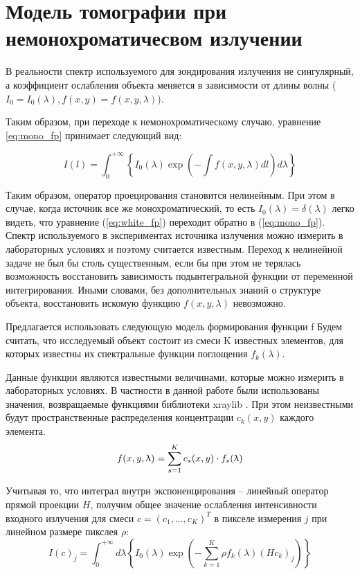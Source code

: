 \section{Модель томографии при немонохроматичесвом излучении}

В реальности спектр используемого для зондирования излучения не сингулярный, а коэффициент ослабления объекта меняется в зависимости от длины волны ($I_0 = I_0(\lambda), f(x, y) = f(x, y, \lambda)$).

Таким образом, при переходе к немонохроматическому случаю, уравнение \ref{eq:mono_fp} принимает следующий вид:

\begin{equation}
\label{eq:white_fp}
I(l) = \int_0^{+\infty}{\left\{
  I_0(\lambda) \exp{\left(-\int{f(x, y, \lambda) dl} \right) d\lambda} 
  \right\}}  
\end{equation}

Таким образом, оператор проецирования становится нелинейным.
При этом в случае, когда источник все же монохроматический, то есть $I_0(\lambda) = \delta(\lambda)$ легко видеть, что уравнение (\ref{eq:white_fp}) переходит обратно в (\ref{eq:mono_fp}).
Спектр используемого в экспериментах источника излучения можно измерить в лабораторных условиях и поэтому считается известным.
Переход к нелинейной задаче не был бы столь существенным, если бы при этом не терялась возможность восстановить зависимость подынтегральной функции от переменной интегрирования. 
Иными словами, без дополнительных знаний о структуре объекта, восстановить искомую функцию $f(x, y, \lambda)$ невозможно.

Предлагается использовать следующую модель формирования функции f %
Будем считать, что исследуемый объект состоит из смеси K известных элементов, для которых известны их спектральные функции поглощения $f_k(\lambda)$.

Данные функции являются известными величинами, которые можно измерить в лабораторных условиях. В частности в данной работе были использованы значения, возвращаемые функциями библиотеки xraylib \cite{xraylib}.
При этом неизвестными будут пространственные распределения концентрации $c_k(x, y)$ каждого элемента.
\begin{equation}
 \notag
  f(x, y, \lambda) = \sum_{s=1}^K {c_s(x, y) \cdot f_s(\lambda)}
\end{equation}

Учитывая то, что интеграл внутри экспоненцирования – линейный оператор прямой проекции $H$, получим общее значение ослабления интенсивности входного излучения для смеси $c = (c_1, \dots, c_K)^T $ в пикселе измерения $j$ при линейном размере пикслея $\rho$:
\begin{equation}
  \label{eq:white_fp_final}
  I(c)_j = \int_0^{+\infty} {d\lambda \left\{
    I_0(\lambda) \exp{\left(
      -\sum_{k=1}^K {\rho f_k(\lambda) (H c_k)_j} 
      \right)}
  \right\}}
\end{equation}

